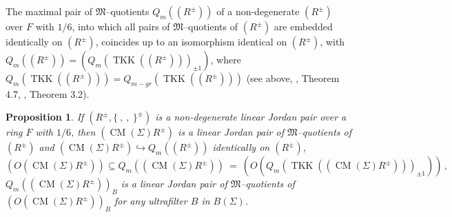 \documentclass[a4paper,11pt]{article}
\newtheorem{prop}[defi]{Proposition}
\DeclareMathOperator{\CM}{CM}
\DeclareMathOperator{\TKK}{TKK}
\begin{document}
The maximal pair of $\mathfrak{M}$--quotients $Q_m((R^{\pm}))$ of a 
non-degenerate $(R^{\pm})$ over $F$ with $1/6$, into which all pairs 
of $\mathfrak{M}$--quotients of $(R^{\pm})$ are embedded identically on 
$(R^{\pm})$, coincides up to an isomorphism identical on $(R^{\pm})$, with   
${Q_m((R^{\pm}))=(Q_m(\TKK((R^{\pm})))_{\pm 1})}$, where 
${Q_m(\TKK((R^{\pm})))=Q_{m-gr}(\TKK((R^{\pm})))}$ (see above, \cite{OMol}, 
Theorem 4.7, \cite{JMQ}, Theorem 3.2). 

\begin{prop} 
If ${(R^{\pm}, \{\ ,\ ,\ \}^{\pm})}$ is a non-degenerate linear Jordan pair 
over a ring $F$ with $1/6$, then $(\CM(\Sigma) R^{\pm})$ is a linear Jordan 
pair of $\mathfrak{M}$--quotients of $(R^{\pm})$ and   
$(\CM(\Sigma) R^{\pm})\hookrightarrow Q_m((R^{\pm}))$ identically on 
${(R^{\pm})}$, 
\[
(O(\CM(\Sigma) R^{\pm}))\subseteq 
Q_m((\CM(\Sigma) R^{\pm}))\ =\ 
(O(Q_m(\TKK((\CM(\Sigma) R^{\pm})))_{\pm 1}))\,,
\]
$Q_m((\CM(\Sigma) R^{\pm}))_B$ is a linear Jordan pair of 
$\mathfrak{M}$--quotients of $(O(\CM(\Sigma) R^{\pm}))_B$ 
for any ultra\-filter $B$ in $B(\Sigma)$.
\end{prop}
\end{document}
